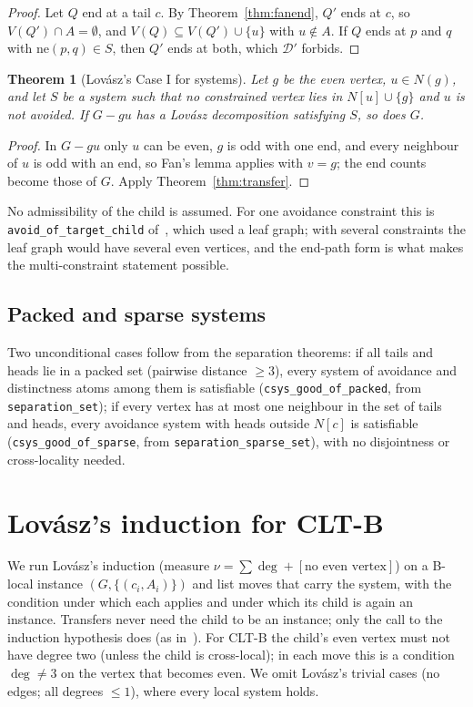 \documentclass[11pt]{amsart}
\newtheorem{theorem}{Theorem}[section]
\theoremstyle{definition}
\newcommand{\cD}{\mathcal D}
\newcommand{\lean}[1]{\quad{\footnotesize[Lean: \texttt{#1}]}}
\newcommand{\nev}{\mathrm{ne}}
\begin{document}
\begin{proof}
Let $Q$ end at a tail $c$. By Theorem~\ref{thm:fanend}, $Q'$ ends at $c$, so $V(Q')\cap A=\emptyset$,
and $V(Q)\subseteq V(Q')\cup\{u\}$ with $u\notin A$. If $Q$ ends at $p$ and $q$ with $\nev(p,q)\in S$,
then $Q'$ ends at both, which $\cD'$ forbids.
\end{proof}

\begin{theorem}[Lov\'asz's Case I for systems]\label{thm:caseI}
Let $g$ be the even vertex, $u\in N(g)$, and let $S$ be a system such that no constrained vertex
lies in $N[u]\cup\{g\}$ and $u$ is not avoided. If $G-gu$ has a Lov\'asz decomposition satisfying
$S$, so does $G$.\lean{csys\_caseI}
\end{theorem}

\begin{proof}
In $G-gu$ only $u$ can be even, $g$ is odd with one end, and every neighbour of $u$ is odd with an
end, so Fan's lemma applies with $v=g$; the end counts become those of $G$. Apply
Theorem~\ref{thm:transfer}.
\end{proof}

No admissibility of the child is assumed. For one avoidance constraint this is
\texttt{avoid\_of\_target\_child} of~\cite{L1I}, which used a leaf graph; with several constraints
the leaf graph would have several even vertices, and the end-path form is what makes the
multi-constraint statement possible.

\subsection*{Packed and sparse systems} Two unconditional cases follow from the separation
theorems: if all tails and heads lie in a packed set (pairwise distance $\ge3$), every system of
avoidance and distinctness atoms among them is satisfiable (\texttt{csys\_good\_of\_packed}, from
\texttt{separation\_set}); if every vertex has at most one neighbour in the set of tails and heads,
every avoidance system with heads outside $N[c]$ is satisfiable (\texttt{csys\_good\_of\_sparse},
from \texttt{separation\_sparse\_set}), with no disjointness or cross-locality needed.

\section{Lov\'asz's induction for CLT-B}\label{sec:ind}

We run Lov\'asz's induction (measure $\nu=\sum\deg+[\text{no even vertex}]$) on a B-local
instance $(G,\{(c_i,A_i)\})$ and list moves that carry the system, with the condition under which
each applies and under which its child is again an instance. Transfers never need the child to be
an instance; only the call to the induction hypothesis does (as in~\cite{L1I}). For CLT-B the child's
even vertex must not have degree two (unless the child is cross-local); in each move this is a
condition $\deg\ne3$ on the vertex that becomes even. We omit Lov\'asz's trivial cases (no edges;
all degrees $\le1$), where every local system holds.
\end{document}
